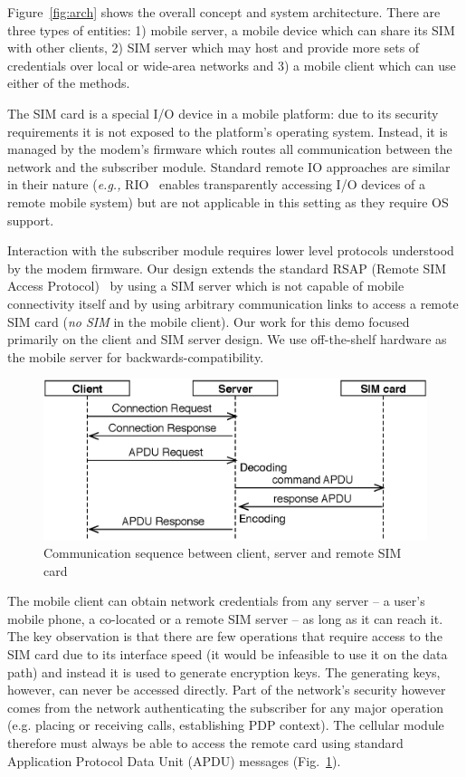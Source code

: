 \documentclass{sig-alternate-2013}
\providecommand{\eg}{\emph{e.g.,} }
\begin{document}
Figure~\ref{fig:arch} shows the overall concept and system architecture. There are three types of entities: 1) mobile server, a mobile device which can share its SIM with other clients, 2) SIM server which may host and provide more sets of credentials over local or wide-area networks and 3) a mobile client which can use either of the methods.

The SIM card is a special I/O device in a mobile platform: due to its security requirements it is not exposed to the platform's operating system. Instead, it is managed by the modem's firmware which routes all communication between the network and the subscriber module. Standard remote IO approaches are similar in their nature (\eg RIO~\cite{Sani:2014hs} enables transparently accessing I/O devices of a remote mobile system) but are not applicable in this setting as they require OS support.

Interaction with the subscriber module requires lower level protocols understood by the modem firmware. Our design extends the standard RSAP (Remote SIM Access Protocol)~\cite{Anonymous:2008vz} by using a SIM server which is not capable of mobile connectivity itself and by using arbitrary communication links to access a remote SIM card (\emph{no SIM} in the mobile client). Our work for this demo focused primarily on the client and SIM server design. We use off-the-shelf hardware as the mobile server for backwards-compatibility. 

\begin{figure}[t!]
\centering
\includegraphics[width=\columnwidth]{figs/sequence}
\caption{Communication sequence between client, server and remote SIM card}
\label{fig:sequence}
\end{figure}

The mobile client can obtain network credentials from any server -- a user's mobile phone, a co-located or a remote SIM server -- as long as it can reach it. The key observation is that there are few operations that require access to the SIM card due to its interface speed (it would be infeasible to use it on the data path) and instead it is used to generate encryption keys. The generating keys, however, can never be accessed directly. Part of the network's security however comes from the network authenticating the subscriber for any major operation (e.g. placing or receiving calls, establishing PDP context). The cellular module therefore must always be able to access the remote card using standard Application Protocol Data Unit (APDU) messages (Fig.~\ref{fig:sequence}).
\end{document}
